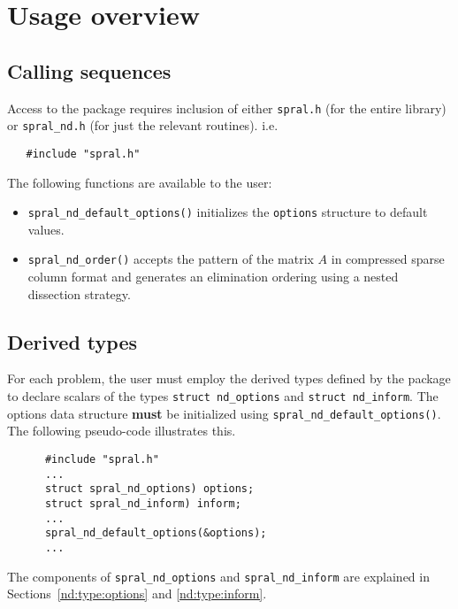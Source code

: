 
\section{Usage overview}

\subsection{Calling sequences}

Access to the package requires inclusion of either \texttt{spral.h} (for the
entire \spral library) or \texttt{spral\_nd.h} (for just the relevant routines). i.e.

\begin{verbatim}
   #include "spral.h"
\end{verbatim}

\noindent
The following functions are available to the user:
\begin{itemize}
\item {\tt spral\_nd\_default\_options()} initializes the \texttt{options}
   structure to default values.

\item {\tt spral\_nd\_order()} accepts the  pattern of the 
matrix $A$ in compressed sparse column format and generates an elimination ordering 
using a nested dissection strategy.

\end{itemize}



\subsection{Derived types}

For each problem, the user must employ the derived types defined by the
package to declare scalars of the types {\tt struct nd\_options} and
{\tt struct nd\_inform}. The options data structure \textbf{must} be
initialized using \texttt{spral\_nd\_default\_options()}.
The following pseudo-code illustrates this.
\begin{verbatim}
      #include "spral.h"
      ...
      struct spral_nd_options) options;
      struct spral_nd_inform) inform;
      ...
      spral_nd_default_options(&options);
      ...
\end{verbatim}
The components of {\tt spral\_nd\_options} and {\tt spral\_nd\_inform} are explained
in Sections~\ref{nd:type:options} and \ref{nd:type:inform}.

